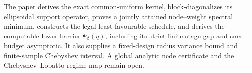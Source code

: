The paper derives the exact common-uniform kernel, block-diagonalizes its ellipsoidal support operator, proves a jointly attained node--weight spectral minimum, constructs the legal least-favourable schedule, and derives the computable lower barrier \(\Psi_\beta(q)\), including its strict finite-stage gap and small-budget asymptotic.  It also supplies a fixed-design radius variance bound and finite-sample Chebyshev interval.  A global analytic node certificate and the Chebyshev--Lobatto regime map remain open.